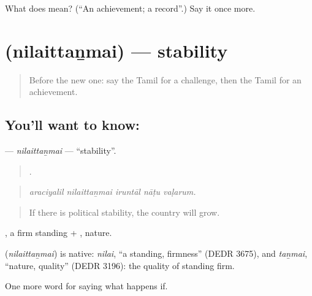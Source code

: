 \begin{tcolorbox}[breakable,colback=teal!4,colframe=teal!35!black,title={Before you move on}]
What does  mean? (\textquotedblleft{}An achievement; a record\textquotedblright{}.) Say it once more.
\end{tcolorbox}
\section[\texorpdfstring{\ta{நிலைத்தன்மை} (nilaittaṉmai)}{நிலைத்தன்மை (nilaittaṉmai)}]{ (nilaittaṉmai) — stability}

\label{lesson:TA-C398-nilaittanmai}



\begin{quote}
Before the new one: say the Tamil for a challenge, then the Tamil for an achievement.
\end{quote}

\subsection*{You'll want to know: }
\textbf{} — \emph{nilaittaṉmai} — \textquotedblleft{}stability\textquotedblright{}.

\begin{quote}
    .
\end{quote}

\begin{quote}
\emph{araciyalil nilaittaṉmai iruntāl nāṭu vaḷarum.}
\end{quote}

\begin{quote}
If there is political stability, the country will grow.
\end{quote}

, a firm standing + , nature.

\begin{cousinweb}
\textbf{} (\emph{nilaittaṉmai}) is native: \emph{nilai}, \textquotedblleft{}a standing, firmness\textquotedblright{} (DEDR 3675), and \emph{taṉmai}, \textquotedblleft{}nature, quality\textquotedblright{} (DEDR 3196): the quality of standing firm.
\end{cousinweb}

\begin{grammarlens}[title={What you've built}]
One more word for saying what happens if.
\end{grammarlens}

